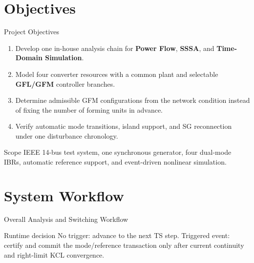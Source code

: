 ﻿\documentclass{beamer}
\begin{document}
\section{Objectives}
\begin{frame}{Project Objectives}
\small
\begin{enumerate}
  \item Develop one in-house analysis chain for \textbf{Power Flow}, \textbf{SSSA}, and \textbf{Time-Domain Simulation}.
  \item Model four converter resources with a common plant and selectable \textbf{GFL/GFM} controller branches.
  \item Determine admissible GFM configurations from the network condition instead of fixing the number of forming units in advance.
  \item Verify automatic mode transitions, island support, and SG reconnection under one disturbance chronology.
\end{enumerate}
\vspace{0.35cm}
\begin{block}{Scope}
IEEE 14-bus test system, one synchronous generator, four dual-mode IBRs, automatic reference support, and event-driven nonlinear simulation.
\end{block}
\end{frame}

\section{System Workflow}
\begin{frame}{Overall Analysis and Switching Workflow}
\centering
{}
\vspace{0.35cm}
\begin{block}{Runtime decision}
\footnotesize No trigger: advance to the next TS step. Triggered event: certify and commit the mode/reference transaction only after current continuity and right-limit KCL convergence.
\end{block}
\end{frame}
\end{document}
